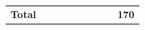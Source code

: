 \documentclass{article}
\begin{document}
\begin{table}[H]
\begin{tabular}{|p{0.8\linewidth}|p{0.2\linewidth}|}
& \\ \hline
\textbf{Total}& \textbf{170}\\ \hline

\end{tabular}
\end{table}
\end{document}
